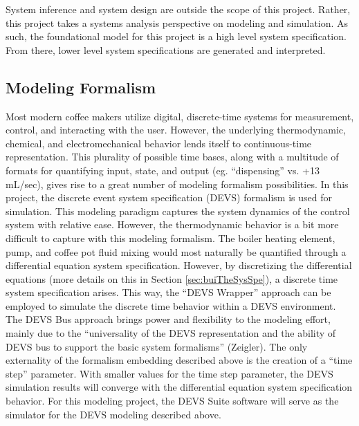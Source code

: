\documentclass[10pt]{article}
\begin{document}
System inference and system design are outside the scope of this project.  Rather, this project takes a systems analysis perspective on modeling and simulation.  As such, the foundational model for this project is a high level system specification.  From there, lower level system specifications are generated and interpreted.


\subsection{Modeling Formalism}
\label{sec:modPar}
Most modern coffee makers utilize digital, discrete-time systems for measurement, control, and interacting with the user.  However, the underlying thermodynamic, chemical, and electromechanical behavior lends itself to continuous-time representation.  This plurality of possible time bases, along with a multitude of formats for quantifying input, state, and output (eg. ``dispensing'' vs. +13 mL/sec), gives rise to a great number of modeling formalism possibilities.  In this project, the discrete event system specification (DEVS) formalism is used for simulation.  This modeling paradigm captures the system dynamics of the control system with relative ease.  However, the thermodynamic behavior is a bit more difficult to capture with this modeling formalism.  The boiler heating element, pump, and coffee pot fluid mixing would most naturally be quantified through a differential equation system specification.  However, by discretizing the differential equations (more details on this in Section \ref{sec:buiTheSysSpe}), a discrete time system specification arises.  This way, the ``DEVS Wrapper'' approach can be employed to simulate the discrete time behavior within a DEVS environment.  The DEVS Bus approach brings power and flexibility to the modeling effort, mainly due to the ``universality of the DEVS representation and the ability of DEVS bus to support the basic system formalisms'' (Zeigler).  The only externality of the formalism embedding described above is the creation of a ``time step'' parameter.  With smaller values for the time step parameter, the DEVS simulation results will converge with the differential equation system specification behavior.  For this modeling project, the DEVS Suite software will serve as the simulator for the DEVS modeling described above.
\end{document}
